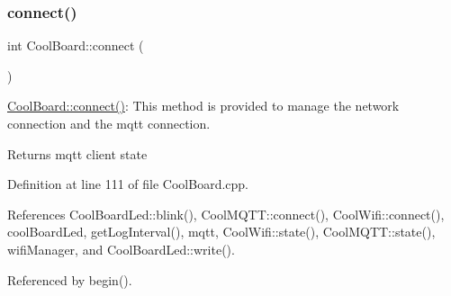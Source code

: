 \subsubsection{\texorpdfstring{connect()}{connect()}}
{\footnotesize\ttfamily int Cool\+Board\+::connect (\begin{DoxyParamCaption}{ }\end{DoxyParamCaption})}

\hyperlink{classCoolBoard_a519de78b807f8ec6463ff484eb925918}{Cool\+Board\+::connect()}\+: This method is provided to manage the network connection and the mqtt connection.

\begin{DoxyReturn}{Returns}
mqtt client state 
\end{DoxyReturn}


Definition at line 111 of file Cool\+Board.\+cpp.



References Cool\+Board\+Led\+::blink(), Cool\+M\+Q\+T\+T\+::connect(), Cool\+Wifi\+::connect(), cool\+Board\+Led, get\+Log\+Interval(), mqtt, Cool\+Wifi\+::state(), Cool\+M\+Q\+T\+T\+::state(), wifi\+Manager, and Cool\+Board\+Led\+::write().



Referenced by begin().



